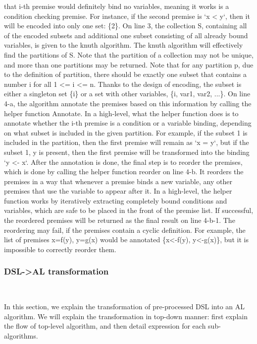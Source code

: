 that i-th premise would definitely bind no variables, meaning it works is a condition checking premise.
For instance, if the second premise is `x < y`, then it will be encoded into only one set: \{2\}.
On line 3, the collection S, containing all of the encoded subsets and additional one subset consisting of
all already bound variables, is given to the knuth algorithm. The knuth algorithm will
effectively find the partitions of S. Note that the partition of a collection may not be unique, and
more than one partitions may be returned. Note that for any partition p, due to the definition of partition,
there should be exactly one subset that contains a number i for all 1 <= i <= n. Thanks to the
design of encoding, the subset is either a singleton set \{i\} or a set with other variables,
\{i, var1, var2, ...\}. On line 4-a, the algorithm annotate the premises based on this information by calling
the helper function Annotate. In a high-level, what the helper function does is to annotate whether
the i-th premise is a condition or
a variable binding, depending on what subset is included in the given partition. For example, if the
subset {1} is included in the partition, then the first premise will remain as `x = y`, but if the
subset {1, y} is present, then the first premise will be transformed into the binding `y <- x`.
After the annotation is done, the final step is to reorder the premises, which is done by calling the helper
function reorder on line 4-b. It reorders the premises in a way that whenever a premise binds a new variable,
any other premises that use the variable to appear after it.
In a high-level, the helper function works by iteratively extracting completely bound
conditions and variables, which are safe to be placed in the front of the premise list.
If successful, the reordered premises will be returned as the final result on
line 4-b-1.  The reordering may fail, if the premises contain a cyclic
definition.  For example, the list of premises {x=f(y), y=g(x)} would be
annotated \{x<-f(y), y<-g(x)\}, but it is impossible to correctly reorder them. 


\subsubsection{\textbf{DSL->AL transformation}}~

In this section, we explain the transformation of pre-processed DSL into an AL algorithm.
We will explain the transformation in top-down manner:
first explain the flow of top-level algorithm,
and then detail expression for each sub-algorithms.

